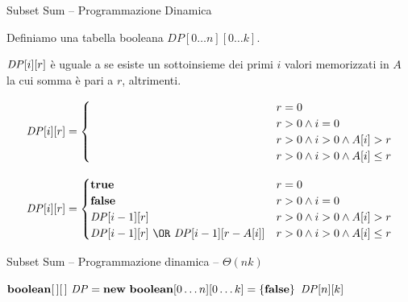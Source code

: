 \begin{frame}{Subset Sum -- Programmazione Dinamica}

Definiamo una tabella booleana $DP[0 \ldots n][0 \ldots k]$. 

\medskip
$\mathit{DP}[i][r]$ è uguale a \TRUE se esiste un sottoinsieme dei primi $i$ valori memorizzati in $A$ la cui somma è pari a $r$, \FALSE altrimenti.

\begin{overprint}
\[
\DP[i][r] = \begin{cases}
  \phantom{\TRUE} & r = 0 \\
  \phantom{\FALSE} & r > 0 \wedge i=0 \\
  \phantom{\DP[i-1][r]}\ & r>0 \wedge i>0 \wedge A[i] > r \\
  \phantom{\DP[i-1][r]\ \OR\ \DP[i-1][r-A[i]]} & r>0 \wedge i>0 \wedge A[i] \leq r \\
\end{cases}
\]

\[
\DP[i][r] = \begin{cases}
  \TRUE & r = 0 \\
  \FALSE & r > 0 \wedge i=0 \\
  \DP[i-1][r]\ & r>0 \wedge i>0 \wedge A[i] > r \\
  \DP[i-1][r]\ \OR\ \DP[i-1][r-A[i]] & r>0 \wedge i>0 \wedge A[i] \leq r
\end{cases}
\]
\end{overprint}

\end{frame}


\begin{frame}{Subset Sum -- Programmazione dinamica -- $\Theta(nk)$}

\vspace{-9pt}
\begin{Procedure}
\caption[A]{\BOOLEAN {}($\INTARRAY\ A,\ \INTEGER\ n,\ \INTEGER\ k$)}
$\BOOLEAN[\,][\,]\ \DP = \NEW\ \BOOLEAN[0 \ldots n][0 \ldots k] = \{ \FALSE \}$\;
\Return $\mathit{DP}[n][k]$\;
\end{Procedure}

\end{frame}

